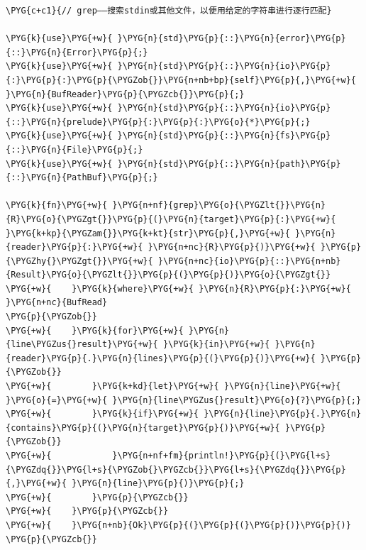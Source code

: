 \begin{Verbatim}[commandchars=\\\{\},breaklines=true,breakanywhere=true,fontsize=\codefont,xleftmargin=17bp]
\PYG{c+c1}{// grep——搜索stdin或其他文件，以便用给定的字符串进行逐行匹配}

\PYG{k}{use}\PYG{+w}{ }\PYG{n}{std}\PYG{p}{::}\PYG{n}{error}\PYG{p}{::}\PYG{n}{Error}\PYG{p}{;}
\PYG{k}{use}\PYG{+w}{ }\PYG{n}{std}\PYG{p}{::}\PYG{n}{io}\PYG{p}{:}\PYG{p}{:}\PYG{p}{\PYGZob{}}\PYG{n+nb+bp}{self}\PYG{p}{,}\PYG{+w}{ }\PYG{n}{BufReader}\PYG{p}{\PYGZcb{}}\PYG{p}{;}
\PYG{k}{use}\PYG{+w}{ }\PYG{n}{std}\PYG{p}{::}\PYG{n}{io}\PYG{p}{::}\PYG{n}{prelude}\PYG{p}{:}\PYG{p}{:}\PYG{o}{*}\PYG{p}{;}
\PYG{k}{use}\PYG{+w}{ }\PYG{n}{std}\PYG{p}{::}\PYG{n}{fs}\PYG{p}{::}\PYG{n}{File}\PYG{p}{;}
\PYG{k}{use}\PYG{+w}{ }\PYG{n}{std}\PYG{p}{::}\PYG{n}{path}\PYG{p}{::}\PYG{n}{PathBuf}\PYG{p}{;}

\PYG{k}{fn}\PYG{+w}{ }\PYG{n+nf}{grep}\PYG{o}{\PYGZlt{}}\PYG{n}{R}\PYG{o}{\PYGZgt{}}\PYG{p}{(}\PYG{n}{target}\PYG{p}{:}\PYG{+w}{ }\PYG{k+kp}{\PYGZam{}}\PYG{k+kt}{str}\PYG{p}{,}\PYG{+w}{ }\PYG{n}{reader}\PYG{p}{:}\PYG{+w}{ }\PYG{n+nc}{R}\PYG{p}{)}\PYG{+w}{ }\PYG{p}{\PYGZhy{}\PYGZgt{}}\PYG{+w}{ }\PYG{n+nc}{io}\PYG{p}{::}\PYG{n+nb}{Result}\PYG{o}{\PYGZlt{}}\PYG{p}{(}\PYG{p}{)}\PYG{o}{\PYGZgt{}}
\PYG{+w}{    }\PYG{k}{where}\PYG{+w}{ }\PYG{n}{R}\PYG{p}{:}\PYG{+w}{ }\PYG{n+nc}{BufRead}
\PYG{p}{\PYGZob{}}
\PYG{+w}{    }\PYG{k}{for}\PYG{+w}{ }\PYG{n}{line\PYGZus{}result}\PYG{+w}{ }\PYG{k}{in}\PYG{+w}{ }\PYG{n}{reader}\PYG{p}{.}\PYG{n}{lines}\PYG{p}{(}\PYG{p}{)}\PYG{+w}{ }\PYG{p}{\PYGZob{}}
\PYG{+w}{        }\PYG{k+kd}{let}\PYG{+w}{ }\PYG{n}{line}\PYG{+w}{ }\PYG{o}{=}\PYG{+w}{ }\PYG{n}{line\PYGZus{}result}\PYG{o}{?}\PYG{p}{;}
\PYG{+w}{        }\PYG{k}{if}\PYG{+w}{ }\PYG{n}{line}\PYG{p}{.}\PYG{n}{contains}\PYG{p}{(}\PYG{n}{target}\PYG{p}{)}\PYG{+w}{ }\PYG{p}{\PYGZob{}}
\PYG{+w}{            }\PYG{n+nf+fm}{println!}\PYG{p}{(}\PYG{l+s}{\PYGZdq{}}\PYG{l+s}{\PYGZob{}\PYGZcb{}}\PYG{l+s}{\PYGZdq{}}\PYG{p}{,}\PYG{+w}{ }\PYG{n}{line}\PYG{p}{)}\PYG{p}{;}
\PYG{+w}{        }\PYG{p}{\PYGZcb{}}
\PYG{+w}{    }\PYG{p}{\PYGZcb{}}
\PYG{+w}{    }\PYG{n+nb}{Ok}\PYG{p}{(}\PYG{p}{(}\PYG{p}{)}\PYG{p}{)}
\PYG{p}{\PYGZcb{}}


\end{Verbatim}
